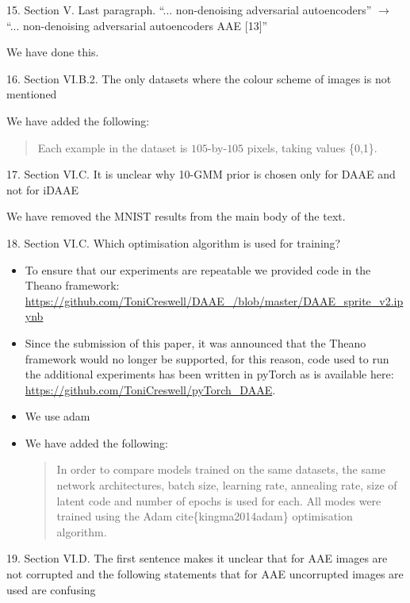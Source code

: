 \documentclass{article}
\begin{document}
{\color{blue}
15. Section V. Last paragraph. ``... non-denoising adversarial autoencoders'' $\rightarrow$ ``... non-denoising adversarial autoencoders AAE [13]''} \newline

We have done this.

{\color{blue}
16. Section VI.B.2. The only datasets where the colour scheme of images is not mentioned} \newline

We have added the following: 
\begin{quote}
     Each example in the dataset is $105$-by-$105$ pixels, taking values \{0,1\}. 
\end{quote}

{\color{blue}
17. Section VI.C. It is unclear why 10-GMM prior is chosen only for DAAE and not for iDAAE} \newline

{\color{red} We have removed the MNIST results from the main body of the text.}

{\color{blue}
18. Section VI.C. Which optimisation algorithm is used for training?}
\begin{itemize}
    \item To ensure that our experiments are repeatable we provided code in the Theano framework: \url{https://github.com/ToniCreswell/DAAE_/blob/master/DAAE_sprite_v2.ipynb}
    \item Since the submission of this paper, it was announced that the Theano framework would no longer be supported, for this reason, code used to run the additional experiments has been written in pyTorch as is available here: \url{https://github.com/ToniCreswell/pyTorch_DAAE}.
    \item We use adam
    \item We have added the following:
    \begin{quote}
        In order to compare models trained on the same datasets, the same network architectures, batch size, learning rate, annealing rate, size of latent code and number of epochs is used for each. All modes were trained using the Adam cite\{kingma2014adam\} optimisation algorithm.
    \end{quote}
\end{itemize}

{\color{blue}
19. Section VI.D. The first sentence makes it unclear that for AAE images are not corrupted and the following statements that for AAE uncorrupted images are used are confusing\\
}
\end{document}
